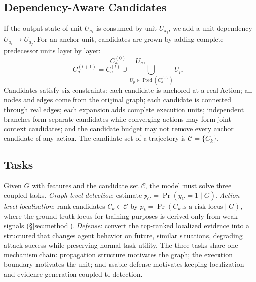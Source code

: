 \subsection{Dependency-Aware Candidates}
If the output state of unit $U_{a_i}$ is consumed by unit $U_{a_j}$, we add a unit dependency $U_{a_i}\rightarrow U_{a_j}$. For an anchor unit, candidates are grown by adding complete predecessor units layer by layer:
\begin{equation}
C_a^{(0)}=U_a,
\label{eq:cand0}
\end{equation}
\begin{equation}
C_a^{(l+1)}=C_a^{(l)}\cup\bigcup_{U_p\in\operatorname{Pred}(C_a^{(l)})}U_p .
\label{eq:cand}
\end{equation}
Candidates satisfy six constraints: each candidate is anchored at a real Action; all nodes and edges come from the original graph; each candidate is connected through real edges; each expansion adds complete execution units; independent branches form separate candidates while converging actions may form joint-context candidates; and the candidate budget may not remove every anchor candidate of any action. The candidate set of a trajectory is $\mathcal{C}=\{C_k\}$.

\subsection{Tasks}
Given $G$ with features and the candidate set $\mathcal{C}$, the model must solve three coupled tasks. \emph{Graph-level detection}: estimate $p_G=\Pr(y_G=1\mid G)$. \emph{Action-level localization}: rank candidates $C_k\in\mathcal{C}$ by $p_k=\Pr(C_k\ \text{is a risk locus}\mid G)$, where the ground-truth locus for training purposes is derived only from weak signals (\S\ref{sec:method}). \emph{Defense}: convert the top-ranked localized evidence into a structured \sexp{} that changes agent behavior on future, similar situations, degrading attack success while preserving normal task utility. The three tasks share one mechanism chain: propagation structure motivates the graph; the execution boundary motivates the unit; and usable defense motivates keeping localization and evidence generation coupled to detection.
